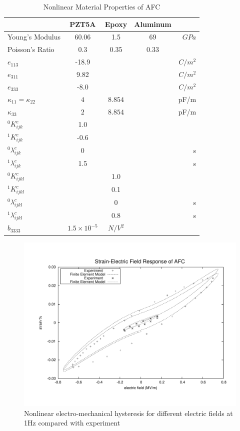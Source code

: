\begin{table}
\caption{Nonlinear Material Properties of AFC}
\centering
\begin{tabular}{|l|c|c|c|r|}
\hline
               & PZT5A & Epoxy & Aluminum & \\ \hline 
Young's Modulus&60.06 & 1.5     & 69       &$GPa$    \\ \hline
Poisson's Ratio&$0.3$ & 0.35    & 0.33 &\\ \hline 
$e_{113}$      &-18.9 &         &      &$C/m^2$\\ \hline
$e_{311}$      &9.82&         &      &$C/m^2$\\ \hline
$e_{333}$      &-8.0  &         &      &$C/m^2$\\ \hline
$\kappa_{11}=\kappa_{22}$ &  $ 4  $ & $8.854  $ & &  pF/m \\ \hline
$\kappa_{33}$ & $2  $              & $8.854  $ & &  pF/m \\ \hline
${}^{0}K_{ijk}^{e}$&1.0& & &  \\ \hline
${}^{1}K_{ijk}^{e}$&-0.6& & & \\ \hline
${}^{0}\lambda_{ijk}^{e}$&0& & & s \\ \hline
${}^{1}\lambda_{ijk}^{e}$&1.5& & & s \\ \hline 
${}^{0}K_{ijkl}^{c}$& &1.0 & &  \\ \hline
${}^{1}K_{ijkl}^{c}$& &0.1 & & \\ \hline
${}^{0}\lambda_{ijkl}^{c}$& &0&  & s\\ \hline
${}^{1}\lambda_{ijkl}^{c}$& &0.8 & & s \\ \hline 
$\widehat{b}_{3333}$ & $1.5 \times 10^{-5}$ &  $ N/V^2 $\\ \hline
\end{tabular}
\label{table:non_linear_materila_properties_afc} 
\end{table} 
 
\begin{figure} 
\centering
\includegraphics[trim = 0mm 0mm 0mm 0mm,width=5.0in]
{./chap_4_structural_analyses/afc_unit_cell/non_linear_hysteris_afc/non_linear_electric_field_vs_polarization.pdf}
\caption{Nonlinear electro-mechanical hysteresis for different electric fields at 1Hz compared with experiment}
\label{fig:non_linear_electric_field_vs_polarization}
\end{figure}

